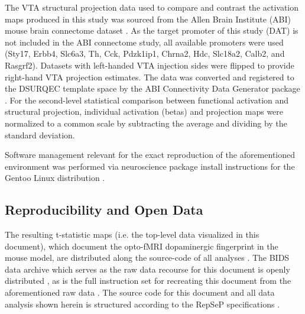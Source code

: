 The VTA structural projection data used to compare and contrast the activation maps produced in this study was sourced from the Allen Brain Institute (ABI) mouse brain connectome dataset \cite{abic}.
As the target promoter of this study (DAT) is not included in the ABI connectome study, all available promoters were used (Sty17, Erbb4, Slc6a3, Th, Cck, Pdzk1ip1, Chrna2, Hdc, Slc18a2, Calb2, and Rasgrf2).
Datasets with left-handed VTA injection sides were flipped to provide right-hand VTA projection estimates.
The data was converted and registered to the DSURQEC template space by the ABI Connectivity Data Generator package \cite{abic_g}.
For the second-level statistical comparison between functional activation and structural projection, individual activation (betas) and projection maps were normalized to a common scale by subtracting the average and dividing by the standard deviation.

Software management relevant for the exact reproduction of the aforementioned environment was performed via neuroscience package install instructions for the Gentoo Linux distribution \cite{ng}.

\subsection{Reproducibility and Open Data}

The resulting t-statistic maps (i.e. the top-level data visualized in this document), which document the opto-fMRI dopaminergic fingerprint in the mouse model, are distributed along the source-code of all analyses \cite{me}.
The BIDS \cite{bids} data archive which serves as the raw data recourse for this document is openly distributed \cite{opfvta_bidsdata}, as is the full instruction set for recreating this document from the aforementioned raw data \cite{me}.
The source code for this document and all data analysis shown herein is structured according to the RepSeP specifications \cite{repsep}.

